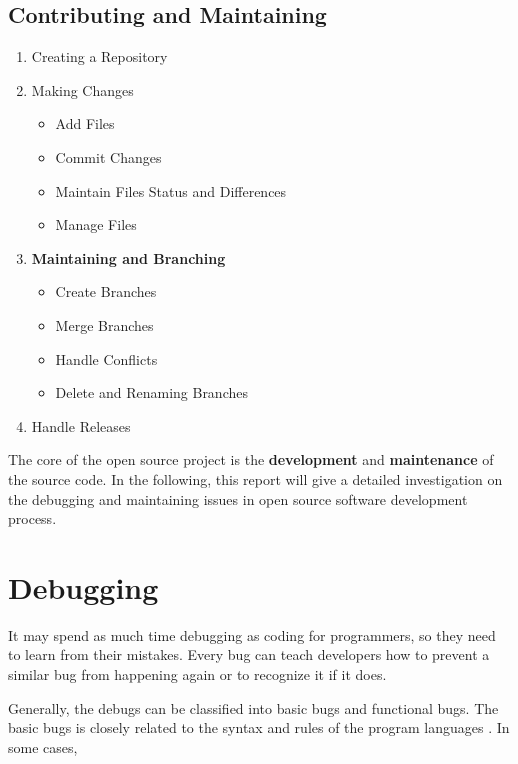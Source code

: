 \documentclass[draftclsnofoot,journal,onecolumn,12pt]{IEEEtran}
\begin{document}
\subsection{Contributing and Maintaining}

\begin{enumerate}
  \item Creating a Repository
  \item Making Changes
  \begin{itemize}
    \item Add Files
    \item Commit Changes
    \item Maintain Files Status and Differences
    \item Manage Files
  \end{itemize}
  \item \textbf{Maintaining and Branching}
  \begin{itemize}
    \item Create Branches
    \item Merge Branches
    \item Handle Conflicts
    \item Delete and Renaming Branches
\end{itemize}
  \item Handle Releases
\end{enumerate}

The core of the open source project is the \textbf{development} and \textbf{maintenance} of the source code. In the following, this report will give a detailed investigation on the debugging and maintaining issues in open source software development process.
 
\section{Debugging}


It may spend as much time debugging as coding for programmers, so they need to learn from their mistakes. Every bug can teach developers how to prevent a similar bug from happening again or to recognize it if it does.

Generally, the debugs can be classified into basic bugs and functional bugs. The basic bugs is closely related to the syntax and rules of the program languages \cite{kernighan1999practice}. In some cases, 
\end{document}
